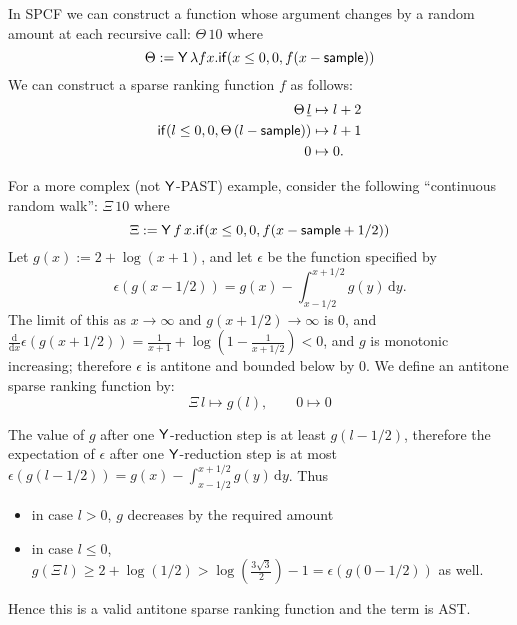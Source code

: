 \begin{example}\label{ex:raven complex}
In SPCF we can construct a function whose argument changes by a random amount at each recursive call: $\Theta \, 10$ where
\[
\Theta := \mathsf{Y} \, \lambda f x . \mathsf{if}(x \leq 0, 0, f(x - \mathsf{sample}))
\]
We can construct a sparse ranking function $f$ as follows:
\begin{align*}
\Theta \, \underline l 
&\mapsto 
l + 2
\\
\mathsf{if}(l \leq 0, 0, \Theta \, (l - \mathsf{sample}))
&\mapsto
l + 1
\\
0 &\mapsto 0.
\end{align*}

For a more complex (not $\mathsf{Y}$-PAST) example, consider the following ``continuous random walk'': $\Xi \, 10$ where
\[
\Xi := \mathsf{Y} \, f \, x . \mathsf{if}(x \leq 0, 0, f(x - \mathsf{sample} + 1/2)) 
\]
Let $g(x) := 2 + \log(x + 1)$, and let $\epsilon$ be the function specified by
\[
\epsilon(g(x-1/2)) = g(x) - \int_{x-1/2}^{x+1/2}g(y) \, \mathrm d y.
\]
The limit of this as $x \to \infty$ and $g(x+1/2) \to \infty$ is 0, and $\frac {\mathrm d}{\mathrm dx} \epsilon(g(x+1/2)) = \frac 1 {x+1} + \log(1 - \frac 1 {x + 1/2}) < 0$, and $g$ is monotonic increasing; 
therefore $\epsilon$ is antitone and bounded below by 0.
We define an antitone sparse ranking function by:
\[
\Xi \, l 
\mapsto 
g(l), \qquad 
0 \mapsto 0
\]

The value of $g$ after one $\mathsf{Y}$-reduction step is at least $g(l-1/2)$, therefore the expectation of $\epsilon$ after one $\mathsf{Y}$-reduction step is at most $\epsilon(g(l-1/2)) = g(x) - \int_{x-1/2}^{x+1/2}g(y) \, \mathrm d y$. 
Thus 
\begin{itemize}
\item in case $l > 0$, $g$ decreases by the required amount
\item in case $l \leq 0$, 
\(
g(\Xi \, l) \geq 2 + \log(1/2) > \log(\frac{3 \sqrt 3} 2) - 1 = \epsilon(g(0-1/2))
\) 
as well.
\end{itemize}
Hence this is a valid antitone sparse ranking function and the term is AST.
\end{example}

